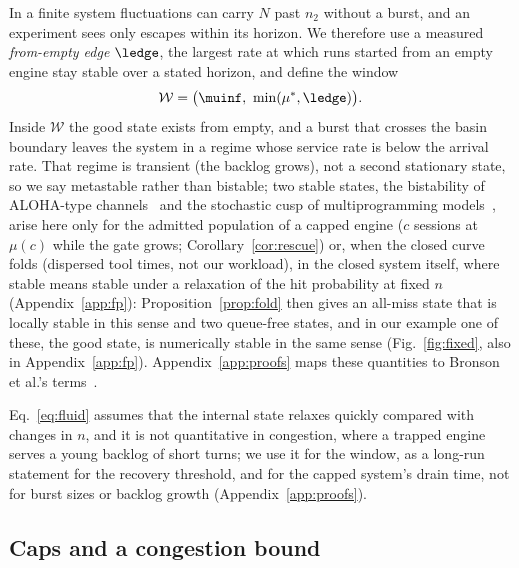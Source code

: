 In a finite system fluctuations can carry $N$ past $n_2$ without a burst, and an experiment sees only escapes within its horizon. We therefore use a measured \emph{from-empty edge} $\ledge$, the largest rate at which runs started from an empty engine stay stable over a stated horizon, and define the window
\begin{equation}\label{eq:window}
\mathcal W=\big(\muinf,\ \min(\mu^*,\ledge)\big).
\end{equation}
Inside $\mathcal W$ the good state exists from empty, and a burst that crosses the basin boundary leaves the system in a regime whose service rate is below the arrival rate. That regime is transient (the backlog grows), not a second stationary state, so we say metastable rather than bistable; two stable states, the bistability of ALOHA-type channels~\citep{carleial1975bistable} and the stochastic cusp of multiprogramming models~\citep{nelson1987stochastic}, arise here only for the admitted population of a capped engine ($c$ sessions at $\mu(c)$ while the gate grows; Corollary~\ref{cor:rescue}) or, when the closed curve folds (dispersed tool times, not our workload), in the closed system itself, where stable means stable under a relaxation of the hit probability at fixed $n$ (Appendix~\ref{app:fp}): Proposition~\ref{prop:fold} then gives an all-miss state that is locally stable in this sense and two queue-free states, and in our example one of these, the good state, is numerically stable in the same sense (Fig.~\ref{fig:fixed}, also in Appendix~\ref{app:fp}). Appendix~\ref{app:proofs} maps these quantities to Bronson et al.'s terms~\citep{bronson2021metastable}.

Eq.~\eqref{eq:fluid} assumes that the internal state relaxes quickly compared with changes in $n$, and it is not quantitative in congestion, where a trapped engine serves a young backlog of short turns; we use it for the window, as a long-run statement for the recovery threshold, and for the capped system's drain time, not for burst sizes or backlog growth (Appendix~\ref{app:proofs}).

\subsection{Caps and a congestion bound}\label{sec:props}

